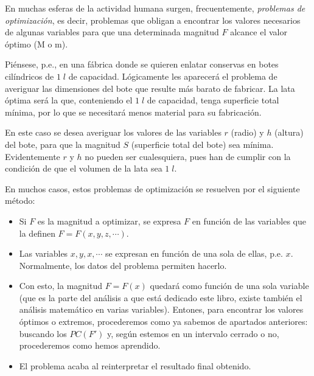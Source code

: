 	En muchas esferas de la actividad humana surgen, frecuentemente, \emph{problemas de optimización}, es decir, problemas que obligan a encontrar los valores necesarios de algunas variables para que una determinada magnitud $F$ alcance el valor óptimo (M o m).
	
	Piénsese, p.e., en una fábrica donde se quieren enlatar conservas en botes cilíndricos de $1 \; l$ de capacidad. Lógicamente les aparecerá el problema de averiguar las dimensiones del bote que resulte más barato de fabricar. La lata óptima será la que, conteniendo el $1 \; l$ de capacidad, tenga superficie total mínima, por lo que se necesitará menos material para su fabricación.
	
	En este caso se desea averiguar los valores de las variables $r$ (radio) y $h$ (altura) del bote, para que la magnitud $S$ (superficie total del bote) sea mínima. Evidentemente $r$ y $h$ no pueden ser cualesquiera, pues han de cumplir con la condición de que el volumen de la lata sea $1 \; l$.
	
	En muchos casos, estos problemas de optimización se resuelven por el siguiente método:
	
	\begin{itemize}
		\item Si $F$ es la magnitud a optimizar, se expresa $F$ en función de las variables que la definen $F=F(x,y,z,\cdots)$.
		\item Las variables $x,y,x,\cdots$ se expresan en función de una sola de ellas, p.e. $x$. Normalmente, los datos del problema permiten hacerlo.
		\item Con esto, la magnitud $F=F(x)$ quedará como función de una sola variable (que es la parte del análisis a que está dedicado este libro, existe también el análisis matemático en varias variables). Entones, para encontrar los valores óptimos o extremos, procederemos como ya sabemos de apartados anteriores: buscando los $PC(F')$ y, según estemos en un intervalo cerrado o no, procederemos como hemos aprendido.
		\item El problema acaba al reinterpretar el resultado final obtenido.
	\end{itemize}
	
